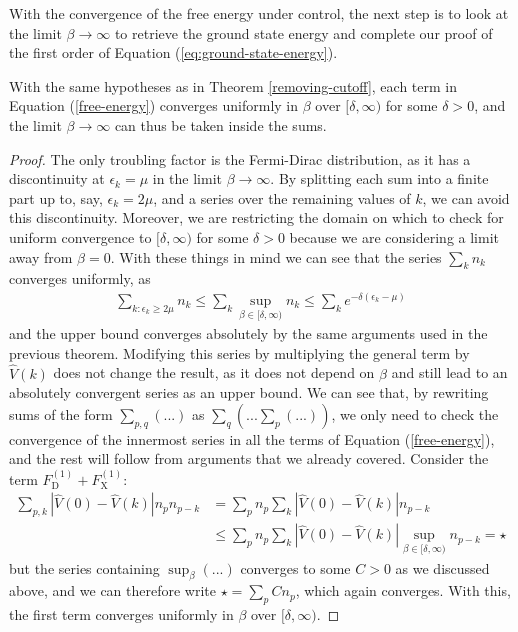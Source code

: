 With the convergence of the free energy under control, the next step is to look at the limit
$\beta\to\infty$ to retrieve the ground state energy and complete our proof of the first order
of Equation (\ref{eq:ground-state-energy}).

\begin{lemma}
	\label{zero-temperature}
	With the same hypotheses as in Theorem \ref{removing-cutoff}, each term in Equation
	(\ref{free-energy}) converges uniformly in $\beta$ over $[\delta,\infty)$ for some
	$\delta>0$, and the limit $\beta \to \infty$ can thus be taken inside the sums.
\end{lemma}
\begin{proof}
	The only troubling factor is the Fermi-Dirac distribution, as it has a discontinuity
	at $\epsilon_k = \mu$ in the limit $\beta\to\infty$. By splitting each sum into a finite
	part up to, say, $\epsilon_k = 2\mu$, and a series over the remaining values of $k$, we
	can avoid this discontinuity. Moreover, we are restricting the domain on which to check
	for uniform convergence to $[\delta,\infty)$ for some $\delta>0$ because we are considering
	a limit away from $\beta=0$. With these things in mind we can see that the series
	$\sum_k n_k$ converges uniformly, as
	\begin{align*}
		\sum_{k:\epsilon_k\geq2\mu} n_k
		\leq \sum_k \sup_{\beta\in[\delta,\infty)} n_k
		\leq \sum_k e^{-\delta(\epsilon_k-\mu)}
	\end{align*}
	and the upper bound converges absolutely by the same arguments used in the previous
	theorem. Modifying this series by multiplying the general term by $\hat{V}(k)$ does not
	change the result, as it does not depend on $\beta$ and still lead to an absolutely
	convergent series as an upper bound. We can see that, by rewriting sums of the form
	$\sum_{p,q}(...)$ as $\sum_q(...\sum_p(...))$, we only need to check the
	convergence of the innermost series in all the terms of Equation (\ref{free-energy}), and
	the rest will follow from arguments that we already covered. Consider the term
	$F^{(1)}_{\mathrm{D}}+F^{(1)}_{\mathrm{X}}$:
	\begin{align*}
		\sum_{p,k} \left|\hat{V}(0)-\hat{V}(k)\right| n_p n_{p-k}
		&= \sum_p n_p \sum_k \left|\hat{V}(0)-\hat{V}(k)\right| n_{p-k}\\
		&\leq \sum_p n_p \sum_k \left|\hat{V}(0)-\hat{V}(k)\right| \sup_{\beta\in[\delta,\infty)}n_{p-k}
		= \star
	\end{align*}
	but the series containing $\sup_\beta(...)$ converges to some $C>0$ as we discussed above,
	and we can therefore write $\star = \sum_p C n_p$, which again converges. With this,
	the first term converges uniformly in $\beta$ over $[\delta,\infty)$.
\end{proof}

